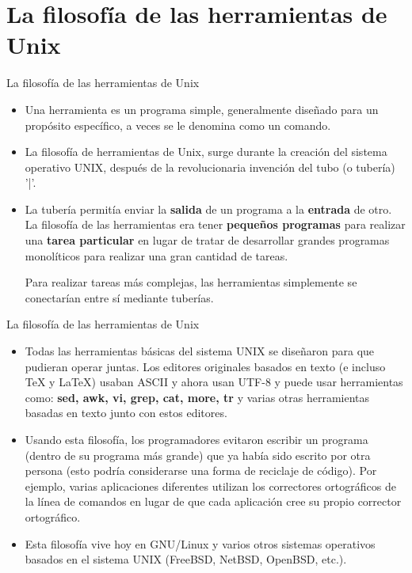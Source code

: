
\section{La filosofía de las herramientas de Unix}

\begin{frame}[c]{La filosofía de las herramientas de Unix}
  \begin{itemize}
    \item Una herramienta es un programa simple, generalmente diseñado para un
      propósito específico, a veces se le denomina como un comando.

    \pausa
    \item La filosofía de herramientas de Unix, surge durante la creación del
      sistema operativo UNIX, después de la revolucionaria invención del
      tubo (o tubería) '|'.

    \pausa
    \item La tubería permitía enviar la \textbf{salida} de un programa a la
      \textbf{entrada} de otro. La filosofía de las herramientas era tener
      \textbf{pequeños programas} para realizar una \textbf{tarea
      particular} en lugar de tratar de desarrollar grandes
      programas monolíticos para realizar una gran cantidad de tareas.

      Para realizar tareas más complejas, las herramientas simplemente se
      conectarían entre sí mediante tuberías.
  \end{itemize}
\end{frame}

\begin{frame}[c]{La filosofía de las herramientas de Unix}
  \begin{itemize}
    \item Todas las herramientas básicas del sistema UNIX se diseñaron para
      que pudieran operar juntas. Los editores originales basados en texto (e
      incluso TeX y LaTeX) usaban ASCII y ahora usan UTF-8 y puede usar
      herramientas como: \textbf{sed, awk, vi, grep, cat, more, tr} y
      varias otras herramientas basadas en texto junto con estos editores.

    \pausa
    \item Usando esta filosofía, los programadores evitaron escribir un
      programa (dentro de su programa más grande) que ya había sido escrito
      por otra persona (esto podría considerarse una forma de reciclaje de
      código). Por ejemplo, varias aplicaciones diferentes utilizan los
      correctores ortográficos de la línea de comandos en lugar de que cada
      aplicación cree su propio corrector ortográfico.

    \pausa
    \item Esta filosofía vive hoy en GNU/Linux y varios otros sistemas
      operativos basados en el sistema UNIX (FreeBSD, NetBSD, OpenBSD, etc.).
  \end{itemize}
\end{frame}

